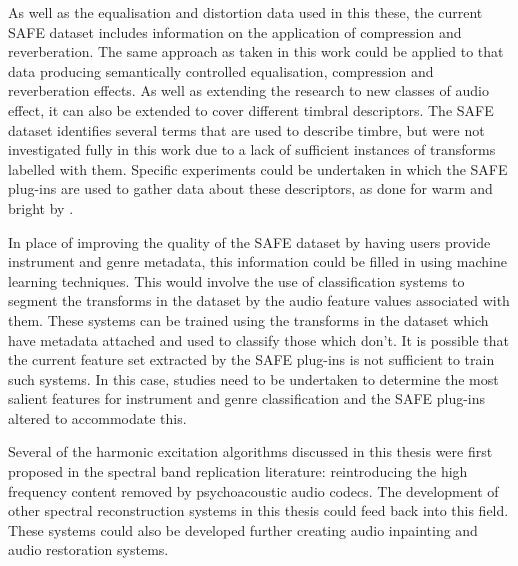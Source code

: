 	As well as the equalisation and distortion data used in this these, the current SAFE dataset includes information on
	the application of compression and reverberation. The same approach as taken in this work could be applied to that
	data producing semantically controlled equalisation, compression and reverberation effects. As well as extending the
	research to new classes of audio effect, it can also be extended to cover different timbral descriptors. The SAFE
	dataset identifies several terms that are used to describe timbre, but were not investigated fully in this work due
	to a lack of sufficient instances of transforms labelled with them. Specific experiments could be undertaken in
	which the SAFE plug-ins are used to gather data about these descriptors, as done for warm and bright by
	\citet{stasis2015a}.

	In place of improving the quality of the SAFE dataset by having users provide instrument and genre metadata, this
	information could be filled in using machine learning techniques. This would involve the use of classification
	systems to segment the transforms in the dataset by the audio feature values associated with them. These systems can
	be trained using the transforms in the dataset which have metadata attached and used to classify those which don't.
	It is possible that the current feature set extracted by the SAFE plug-ins is not sufficient to train such systems.
	In this case, studies need to be undertaken to determine the most salient features for instrument and genre
	classification and the SAFE plug-ins altered to accommodate this.

	Several of the harmonic excitation algorithms discussed in this thesis were first proposed in the spectral band
	replication literature: reintroducing the high frequency content removed by psychoacoustic audio codecs. The
	development of other spectral reconstruction systems in this thesis could feed back into this field. These systems
	could also be developed further creating audio inpainting and audio restoration systems.

